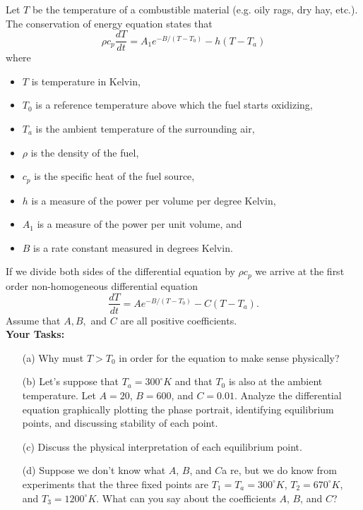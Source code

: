 \begin{problem}
    Let $T$ be the temperature of a combustible material (e.g. oily rags, dry hay, etc.).
    The conservation of energy equation states that 
    \[ \rho c_p \frac{dT}{dt} = A_1 e^{-B/(T-T_0)} - h\left( T - T_a \right) \]
    where 
    \begin{itemize}
        \item $T$ is temperature in Kelvin,
        \item $T_0$ is a reference temperature above which the fuel starts oxidizing,
        \item $T_a$ is the ambient temperature of the surrounding air,
        \item $\rho$ is the density of the fuel,
        \item $c_p$ is the specific heat of the fuel source, 
        \item $h$ is a measure of the power per volume per degree Kelvin,
        \item $A_1$ is a measure of the power per unit volume, and
        \item $B$ is a rate constant measured in degrees Kelvin.
    \end{itemize}
    If we divide both sides of the differential equation by $\rho c_p$ we arrive at the
    first order non-homogeneous differential equation
    \[ \frac{dT}{dt} = A e^{-B/(T-T_0)} - C \left( T - T_a \right). \]  
    Assume that $A, B,$ and $C$ are all positive coefficients.
    \\{\bf Your Tasks:}
    \begin{enumerate}
        \item[(a)] Why must $T > T_0$ in order for the equation to make sense physically?
        \item[(b)] Let's suppose that $T_a = 300^\circ K$ and that $T_0$ is also at the
            ambient temperature.  Let $A = 20$, $B = 600$, and $C = 0.01$.  Analyze the
            differential equation graphically plotting the phase portrait, identifying
            equilibrium points, and discussing stability of each point.
        \item[(c)] Discuss the physical interpretation of each equilibrium point.
        \item[(d)] Suppose we don't know what $A$, $B$, and $C$a re, but we do know from
            experiments that the three fixed points are $T_1 = T_a = 300^\circ K$, $T_2 =
            670^\circ K$, and $T_3 = 1200^\circ K$.  What can you say about the
            coefficients $A$, $B$, and $C$?
    \end{enumerate}
\end{problem}
